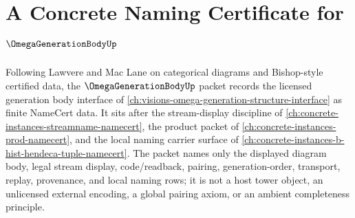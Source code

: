 \chapter{A Concrete Naming Certificate for $\OmegaGenerationBodyUp$}
\label{ch:concrete-instances-omega-generation-body-namecert}

Following Lawvere and Mac Lane on categorical diagrams and Bishop-style certified data, the $\OmegaGenerationBodyUp$ packet records the licensed generation body interface of \autoref{ch:visions-omega-generation-structure-interface} as finite NameCert data. It sits after the stream-display discipline of \autoref{ch:concrete-instances-streamname-namecert}, the product packet of \autoref{ch:concrete-instances-prod-namecert}, and the local naming carrier surface of \autoref{ch:concrete-instances-b-hist-hendeca-tuple-namecert}. The packet names only the displayed diagram body, legal stream display, code/readback, pairing, generation-order, transport, replay, provenance, and local naming rows; it is not a host tower object, an unlicensed external encoding, a global pairing axiom, or an ambient completeness principle.

